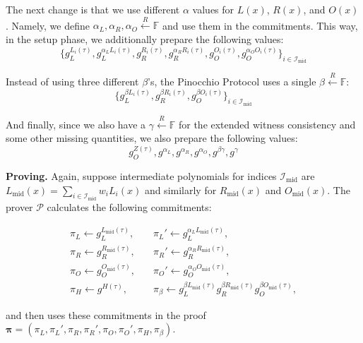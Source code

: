 \documentclass[../lecture-notes-148x210.tex]{subfiles}
\begin{document}
The next change is that we use different $\alpha$ values for $L(x)$, $R(x)$, and $O(x)$. Namely, we define $\alpha_L,\alpha_R,\alpha_O \xleftarrow{R} \mathbb{F}$ and use them in the commitments. This way, in the setup phase, we additionally prepare the following values:
\begin{equation*}
    \{g_L^{L_i(\tau)}, g_L^{\alpha_LL_i(\tau)}, g_R^{R_i(\tau)}, g_R^{\alpha_RR_i(\tau)}, g_O^{O_i(\tau)}, g_O^{\alpha_O O_i(\tau)}\}_{i \in \mathcal{I}_{\text{mid}}}
\end{equation*}

Instead of using three different $\beta$'s, the Pinocchio Protocol uses a single $\beta \xleftarrow{R} \mathbb{F}$:
\begin{equation*}
    \{g_L^{\beta L_i(\tau)}, g_R^{\beta R_i(\tau)},g_O^{\beta O_i(\tau)} \}_{i \in \mathcal{I}_{\text{mid}}}
\end{equation*}

And finally, since we also have a $\gamma \xleftarrow{R} \mathbb{F}$ for the extended witness consistency and some other missing quantities, we also prepare the following values:
\begin{equation*}
    g_O^{Z(\tau)}, g^{\alpha_L}, g^{\alpha_R}, g^{\alpha_O},g^{\beta\gamma}, g^{\gamma}
\end{equation*}

\textcolor{green!50!black}{\textbf{Proving.}} Again, suppose intermediate polynomials for indices $\mathcal{I}_{\text{mid}}$ are $L_{\text{mid}}(x) = \sum_{i \in \mathcal{I}_{\text{mid}}}w_iL_i(x)$ and similarly for $R_{\text{mid}}(x)$ and $O_{\text{mid}}(x)$. The prover $\mathcal{P}$ calculates the following commitments:

\begin{align*}
    \pi_L \gets g_L^{L_{\text{mid}}(\tau)}, & \quad \pi_L' \gets g_L^{\alpha_LL_{\text{mid}}(\tau)}, \\
    \pi_R \gets g_R^{R_{\text{mid}}(\tau)}, & \quad \pi_R' \gets g_R^{\alpha_RR_{\text{mid}}(\tau)}, \\
    \pi_O \gets g_O^{O_{\text{mid}}(\tau)}, & \quad \pi_O' \gets g_O^{\alpha_OO_{\text{mid}}(\tau)}, \\
    \pi_H \gets g^{H(\tau)}, & \quad \pi_{\beta} \gets g_L^{\beta L_{\text{mid}}(\tau)}g_R^{\beta R_{\text{mid}}(\tau)}g_O^{\beta O_{\text{mid}}(\tau)},
\end{align*}

and then uses these commitments in the proof $\boldsymbol{\pi} = (\pi_L,\pi_L',\pi_R,\pi_R',\pi_O,\pi_O',\pi_H,\pi_{\beta})$.
\end{document}
